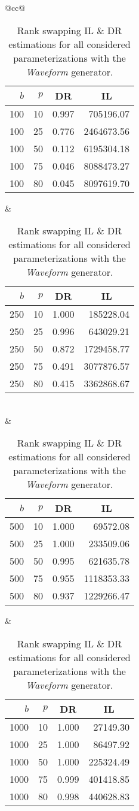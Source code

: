 \begin{table}[H]
	\centering
	\begin{tabular}{@{}cc@{}}
		\begin{tabular}{@{}rrrr@{}}
			\toprule
			$b$ & $p$ & \multicolumn{1}{c}{DR} & \multicolumn{1}{c}{IL} \\ \midrule
			100  & 10 & 0.997 & 705196.07  \\
			100  & 25 & 0.776 & 2464673.56 \\
			100  & 50 & 0.112 & 6195304.18 \\
			100  & 75 & 0.046 & 8088473.27 \\
			100  & 80 & 0.045 & 8097619.70 \\ \bottomrule
		\end{tabular}
		&
		\begin{tabular}{@{}rrrr@{}}
			\toprule
			$b$ & $p$ & \multicolumn{1}{c}{DR} & \multicolumn{1}{c}{IL} \\ \midrule
			250  & 10 & 1.000 & 185228.04  \\
			250  & 25 & 0.996 & 643029.21  \\
			250  & 50 & 0.872 & 1729458.77 \\
			250  & 75 & 0.491 & 3077876.57 \\
			250  & 80 & 0.415 & 3362868.67 \\ \bottomrule
		\end{tabular}
		\\ & \\
		\begin{tabular}{@{}rrrr@{}}
			\toprule
			$b$ & $p$ & \multicolumn{1}{c}{DR} & \multicolumn{1}{c}{IL} \\ \midrule
			500  & 10 & 1.000 & 69572.08   \\
			500  & 25 & 1.000 & 233509.06  \\
			500  & 50 & 0.995 & 621635.78  \\
			500  & 75 & 0.955 & 1118353.33 \\
			500  & 80 & 0.937 & 1229266.47 \\ \bottomrule
		\end{tabular}
		&
		\begin{tabular}{@{}rrrr@{}}
			\toprule
			$b$ & $p$ & \multicolumn{1}{c}{DR} & \multicolumn{1}{c}{IL} \\ \midrule
			1000 & 10 & 1.000 & 27149.30   \\
			1000 & 25 & 1.000 & 86497.92   \\
			1000 & 50 & 1.000 & 225324.49  \\
			1000 & 75 & 0.999 & 401418.85  \\
			1000 & 80 & 0.998 & 440628.83  \\ \bottomrule
		\end{tabular}
	\end{tabular}
	\caption[Rank swapping DR \& IL estimations (Waveform).]{Rank swapping IL \& DR estimations for all considered parameterizations with the \textit{Waveform} generator.}
	\label{table:results-wave-rankswapping}
\end{table}

